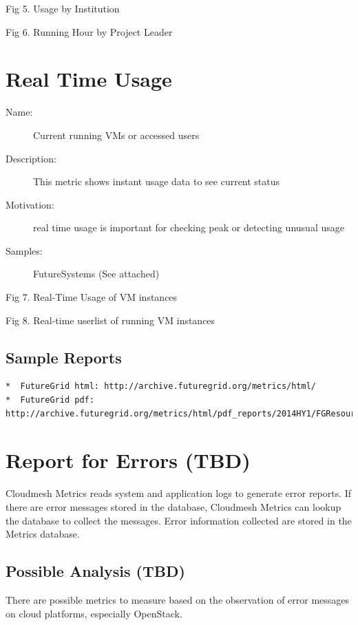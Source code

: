 \documentclass{sig-alternate}
\begin{document}
 
Fig 5. Usage by Institution

 
Fig 6. Running Hour by Project Leader

\section{Real Time Usage}
\begin{description}
\item[Name:] Current running VMs or accessed users
\item[Description:] This metric shows instant usage data to see current status
\item[Motivation:] real time usage is important for checking peak or detecting unusual usage
\item[Samples:] FutureSystems (See attached)
\end{description}

 
Fig 7. Real-Time Usage of VM instances


 
Fig 8. Real-time userlist of running VM instances

\subsection{Sample Reports}

\begin{verbatim}
*  FutureGrid html: http://archive.futuregrid.org/metrics/html/
*  FutureGrid pdf: http://archive.futuregrid.org/metrics/html/pdf_reports/2014HY1/FGResourceReport.pdf
\end{verbatim}

\section{Report for Errors (TBD)}

Cloudmesh Metrics reads system and application logs to generate error reports. If there are error messages stored in the database, Cloudmesh Metrics can lookup the database to collect the messages. Error information collected are stored in the Metrics database.

\subsection{Possible Analysis (TBD)}

There are possible metrics to measure based on the observation of error messages on cloud platforms, especially OpenStack.
\end{document}
